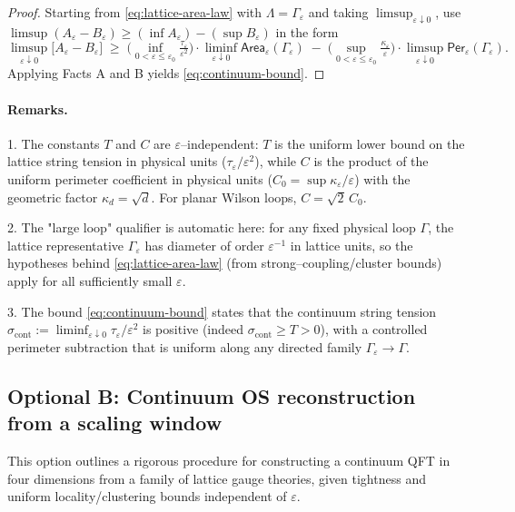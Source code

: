 \documentclass[11pt]{amsart}
\theoremstyle{plain}
\theoremstyle{definition}
\theoremstyle{remark}
\begin{document}
\begin{proof}
Starting from \eqref{eq:lattice-area-law} with $\Lambda=\Gamma_\varepsilon$ and taking $\limsup_{\varepsilon\downarrow 0}$, use $\limsup(A_\varepsilon-B_\varepsilon)\ge (\inf A_\varepsilon)-(\sup B_\varepsilon)$ in the form
\[
  \limsup_{\varepsilon\downarrow 0}\bigl[A_\varepsilon-B_\varepsilon\bigr]
  \;\ge\;
  \Big(\inf_{0<\varepsilon\le\varepsilon_0}\tfrac{\tau_\varepsilon}{\varepsilon^2}\Big)\cdot
  \liminf_{\varepsilon\downarrow 0}\mathsf{Area}_\varepsilon(\Gamma_\varepsilon)
  \;-
  \;\Big(\sup_{0<\varepsilon\le\varepsilon_0}\tfrac{\kappa_\varepsilon}{\varepsilon}\Big)\cdot
  \limsup_{\varepsilon\downarrow 0}\mathsf{Per}_\varepsilon(\Gamma_\varepsilon).
\]
Applying Facts A and B yields \eqref{eq:continuum-bound}.
\end{proof}

\paragraph{Remarks.}
1. The constants $T$ and $C$ are $\varepsilon$--independent: $T$ is the uniform lower bound on the lattice string tension in physical units ($\tau_\varepsilon/\varepsilon^2$), while $C$ is the product of the uniform perimeter coefficient in physical units ($C_0=\sup\kappa_\varepsilon/\varepsilon$) with the geometric factor $\kappa_d=\sqrt{d}$. For planar Wilson loops, $C=\sqrt{2}\,C_0$.

2. The "large loop" qualifier is automatic here: for any fixed physical loop $\Gamma$, the lattice representative $\Gamma_\varepsilon$ has diameter of order $\varepsilon^{-1}$ in lattice units, so the hypotheses behind \eqref{eq:lattice-area-law} (from strong--coupling/cluster bounds) apply for all sufficiently small $\varepsilon$.

3. The bound \eqref{eq:continuum-bound} states that the continuum string tension $\sigma_{\text{cont}}:=\liminf_{\varepsilon\downarrow 0}\tau_\varepsilon/\varepsilon^2$ is positive (indeed $\sigma_{\text{cont}}\ge T>0$), with a controlled perimeter subtraction that is uniform along any directed family $\Gamma_\varepsilon\to\Gamma$.

\subsection*{Optional B: Continuum OS reconstruction from a scaling window}

This option outlines a rigorous procedure for constructing a continuum QFT in four dimensions from a family of lattice gauge theories, given tightness and uniform locality/clustering bounds independent of $\varepsilon$.
\end{document}
